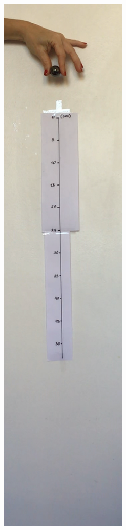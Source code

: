   \begin{minipage}{\linewidth}
      \centering
      \begin{minipage}{0.25\linewidth}
          \begin{figure}[H]
              \includegraphics[width=\linewidth]{Figuras_exp3/fig1.pdf}

\end{figure}
\end{minipage}
\end{minipage}
